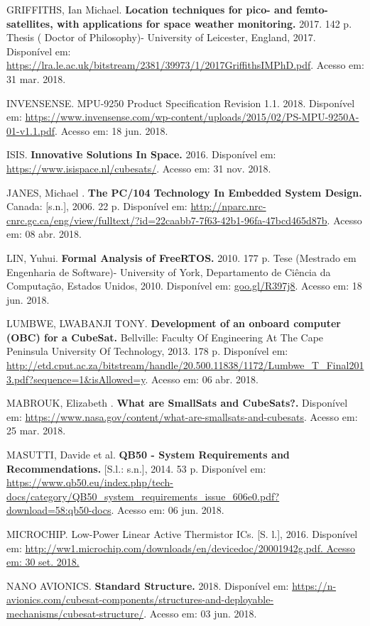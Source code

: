 \noindent GRIFFITHS, Ian Michael. \textbf{Location techniques for pico- and femto-satellites, with applications for space weather monitoring. } 2017. 142 p. Thesis ( Doctor of Philosophy)- University of Leicester, England, 2017. Disponível em: \url{https://lra.le.ac.uk/bitstream/2381/39973/1/2017GriffithsIMPhD.pdf}. Acesso em: 31 mar. 2018.

\noindent INVENSENSE. MPU-9250 Product Specification Revision 1.1. 2018. Disponível em: \url{https://www.invensense.com/wp-content/uploads/2015/02/PS-MPU-9250A-01-v1.1.pdf}. Acesso em: 18 jun. 2018.

\noindent ISIS. \textbf{Innovative Solutions In Space. } 2016. Disponível em: \url{https://www.isispace.nl/cubesats/}. Acesso em: 31 nov. 2018.

\noindent JANES, Michael . \textbf{The PC/104 Technology In Embedded System Design. } Canada: [s.n.], 2006. 22 p. Disponível em: \url{http://nparc.nrc-cnrc.gc.ca/eng/view/fulltext/?id=22caabb7-7f63-42b1-96fa-47bcd465d87b}. Acesso em: 08 abr. 2018.

\noindent LIN, Yuhui. \textbf{Formal Analysis of FreeRTOS.} 2010. 177 p. Tese (Mestrado em Engenharia de Software)- University of York, Departamento de Ciência da Computação, Estados Unidos, 2010. Disponível em: \url{goo.gl/R397j8}. Acesso em: 18 jun. 2018.

\noindent LUMBWE, LWABANJI TONY. \textbf{Development of an onboard computer (OBC) for a CubeSat. } Bellville: Faculty Of Engineering At The Cape Peninsula University Of Technology, 2013. 178 p. Disponível em: \url{http://etd.cput.ac.za/bitstream/handle/20.500.11838/1172/Lumbwe_T_Final2013.pdf?sequence=1&isAllowed=y}. Acesso em: 06 abr. 2018.

\noindent MABROUK, Elizabeth . \textbf{What are SmallSats and CubeSats?. } Disponível em: \url{https://www.nasa.gov/content/what-are-smallsats-and-cubesats}. Acesso em: 25 mar. 2018.

\noindent MASUTTI, Davide et al. \textbf{QB50 - System Requirements and Recommendations.} [S.l.: s.n.], 2014. 53 p. Disponível em: \url{https://www.qb50.eu/index.php/tech-docs/category/QB50_system_requirements_issue_606e0.pdf?download=58:qb50-docs}. Acesso em: 06 jun. 2018.

\noindent MICROCHIP. Low-Power Linear Active Thermistor ICs. [S. l.], 2016. Disponível em: \url{http://ww1.microchip.com/downloads/en/devicedoc/20001942g.pdf. Acesso em: 30 set. 2018.}

\noindent NANO AVIONICS. \textbf{Standard Structure. } 2018. Disponível em: \url{https://n-avionics.com/cubesat-components/structures-and-deployable-mechanisms/cubesat-structure/}. Acesso em: 03 jun. 2018.

